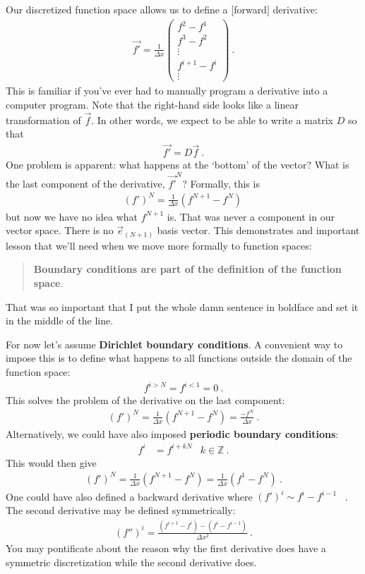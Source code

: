Our discretized function space allows us to define a [forward] derivative:
\begin{align}
  \vec{f'} =
  \frac{1}{\Delta x}
  \begin{pmatrix}
    f^2 - f^1 \\
    f^3 - f^2 \\
    \vdots
    \\
    f^{i+1}-f^i
    \\
    \vdots
  \end{pmatrix} \ .
\end{align}
This is familiar if you’ve ever had to manually program a derivative into a computer program. Note that the right-hand side looks like a linear transformation of $\vec{f}$. In other words, we expect to be able to write a matrix $D$ so that
\begin{align}
  \vec{f'} = D\vec{f} \ .
\end{align}
One problem is apparent: what happens at the `bottom’ of the vector? What is the last component of the derivative, $\vec{f'}^N$? Formally, this is
\begin{align}
  {(f')}^N = \frac{1}{\Delta x}(f^{N+1} - f^N) \,
\end{align}
but now we have no idea what $f^{N+1}$ is. That was never a component in our vector space. There is no $\vec{e}_{(N+1)}$ basis vector. 
%
This demonstrates and important lesson that we’ll need when we move more formally to function spaces:
\begin{quote}
\textbf{Boundary conditions are part of the definition of the function space}.   
\end{quote}
That was so important that I put the whole damn sentence in boldface and set it in the middle of the line. 

For now let’s assume \textbf{Dirichlet boundary conditions}. A convenient way to impose this is to define what happens to all functions outside the domain of the function space:
\begin{align}
  f^{i > N} = f^{i < 1} = 0 \ .
\end{align}
This solves the problem of the derivative on the last component:
\begin{align}
  {(f')}^N = \frac{1}{\Delta x}(f^{N+1} - f^N) 
  = 
  \frac{- f^N}{\Delta x}  \ .
\end{align}
Alternatively, we could have also imposed \textbf{periodic boundary conditions}:
\begin{align}
  f^{i} &= f^{i+ kN}
  & k\in \mathbb{Z} \ .
\end{align}
This would then give
\begin{align}
  {(f')}^N = \frac{1}{\Delta x}(f^{N+1} - f^N) 
  = 
  \frac{1}{\Delta x}(f^{1} - f^N) 
  \ .
\end{align}
One could have also defined a backward derivative where $(f')^i \sim f^{i}-f^{i-1}$ \ . The second derivative may be defined symmetrically:
\begin{align}
  (f'')^i = \frac{(f^{i+1} - f^i) - (f^i - f^{i-1})}{\Delta x^2} \ .
\end{align}
You may pontificate about the reason why the first derivative does have a symmetric discretization while the second derivative does. 


